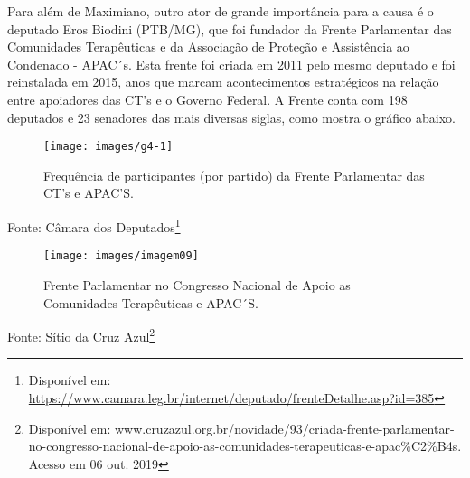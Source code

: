 \documentclass[
	12pt,				%
	oneside,			%
	a4paper,			%
	sumario=tradicional,
	english,			%
	brazil				%
	]{abntex2}
\newcommand{\bcenter}{\begin{center}}
\newcommand{\ecenter}{\end{center}}
\begin{document}
Para além de Maximiano, outro ator de grande importância para a causa é o deputado Eros Biodini (PTB/MG), que foi fundador da Frente Parlamentar das Comunidades Terapêuticas e da Associação de Proteção e Assistência ao Condenado - APAC´s. Esta frente foi criada em 2011 pelo mesmo deputado e foi reinstalada em 2015, anos que marcam acontecimentos estratégicos na relação entre apoiadores das CT's e o Governo Federal. A Frente conta com 198 deputados e 23 senadores das mais diversas siglas, como mostra o gráfico abaixo.
\begin{figure}[H]

{\centering \texttt{[image: images/g4-1]} 

}

\caption{Frequência de participantes (por partido) da Frente Parlamentar das CT's e APAC’S.}\label{fig:g4}
\end{figure}
\bcenter

Fonte: Câmara dos Deputados\footnote{Disponível em: \url{https://www.camara.leg.br/internet/deputado/frenteDetalhe.asp?id=385}}
\ecenter
\begin{figure}[H]

{\centering \texttt{[image: images/imagem09]} 

}

\caption{Frente Parlamentar no Congresso Nacional de Apoio as Comunidades Terapêuticas e APAC´S.}\label{fig:imagem9}
\end{figure}
\bcenter

Fonte: Sítio da Cruz Azul\footnote{Disponível em: www.cruzazul.org.br/novidade/93/criada-frente-parlamentar-no-congresso-nacional-de-apoio-as-comunidades-terapeuticas-e-apac\%C2\%B4s. Acesso em 06 out. 2019}
\ecenter
\end{document}
